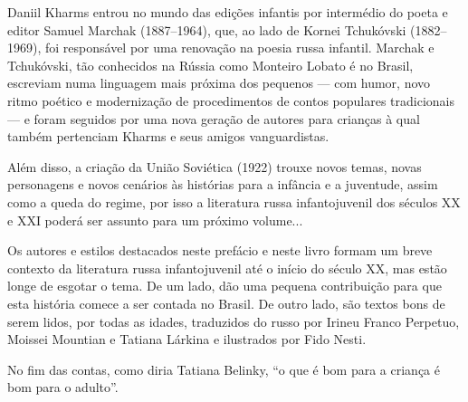 Daniil Kharms entrou no mundo das edições infantis por intermédio do
poeta e editor Samuel Marchak (1887--1964), que, ao lado de Kornei
Tchukóvski (1882--1969), foi responsável por uma renovação na poesia
russa infantil. Marchak e Tchukóvski, tão conhecidos na Rússia como
Monteiro Lobato é no Brasil, escreviam numa linguagem mais próxima dos
pequenos --- com humor, novo ritmo poético e modernização de
procedimentos de contos populares tradicionais --- e foram seguidos por
uma nova geração de autores para crianças à qual também pertenciam
Kharms e seus amigos vanguardistas.

Além disso, a criação da União Soviética (1922) trouxe novos temas,
novas personagens e novos cenários às histórias para a infância e a
juventude, assim como a queda do regime, por isso a literatura russa
infantojuvenil dos séculos XX e XXI poderá ser assunto para um próximo
volume...

Os autores e estilos destacados neste prefácio e neste livro formam um
breve contexto da literatura russa infantojuvenil até o início do século
XX, mas estão longe de esgotar o tema. De um lado, dão uma pequena
contribuição para que esta história comece a ser contada no Brasil. De
outro lado, são textos bons de serem lidos, por todas as idades,
traduzidos do russo por Irineu Franco Perpetuo, Moissei Mountian e
Tatiana Lárkina e ilustrados por Fido Nesti.

No fim das contas, como diria Tatiana Belinky, ``o que é bom para a
criança é bom para o adulto''.

